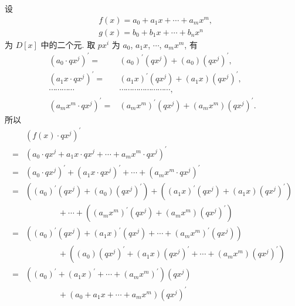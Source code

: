 \begin{pf}
    设
    \begin{align*}
         & f(x) = a_0 + a_1 x + \cdots + a_m x^m, \\
         & g(x) = b_0 + b_1 x + \cdots + b_n x^n
    \end{align*}
    为 $D[x]$ 中的二个元. 取 $px^i$ 为 $a_0$, $a_1 x$, $\cdots$, $a_m x^m$, 有
    \begin{align*}
        (a_0 \cdot qx^j)^{\prime}     = {} & (a_0)^{\prime} (qx^j) + (a_0) (qx^j)^{\prime},           \\
        (a_1 x \cdot qx^j)^{\prime}   = {} & (a_1 x)^{\prime} (qx^j) + (a_1 x) (qx^j)^{\prime},       \\
        \cdots \cdots \cdots \cdots        & \cdots \cdots \cdots \cdots \cdots \cdots \cdots \cdots, \\
        (a_m x^m \cdot qx^j)^{\prime} = {} & (a_m x^m)^{\prime} (qx^j) + (a_m x^m) (qx^j)^{\prime}.
    \end{align*}
    所以
    \begin{align*}
             & (f(x) \cdot qx^j)^{\prime}                                                                             \\
        = {} & (a_0 \cdot qx^j + a_1 x \cdot qx^j + \cdots + a_m x^m \cdot qx^j)^{\prime}                             \\
        = {} & (a_0 \cdot qx^j)^{\prime} + (a_1 x \cdot qx^j)^{\prime} + \cdots
        + (a_m x^m \cdot qx^j)^{\prime}                                                                               \\
        = {} & ((a_0)^{\prime} (qx^j) + (a_0) (qx^j)^{\prime}) + ((a_1 x)^{\prime} (qx^j)
        + (a_1 x) (qx^j)^{\prime})                                                                                    \\
             & \qquad \qquad + \cdots + ((a_m x^m)^{\prime} (qx^j) + (a_m x^m) (qx^j)^{\prime})                       \\
        = {} & ((a_0)^{\prime} (qx^j) + (a_1 x)^{\prime} (qx^j) + \cdots + (a_m x^m)^{\prime} (qx^j))                 \\
             & \qquad \qquad + ((a_0) (qx^j)^{\prime} + (a_1 x) (qx^j)^{\prime} + \cdots + (a_m x^m) (qx^j)^{\prime}) \\
        = {} & ((a_0)^{\prime} + (a_1 x)^{\prime} + \cdots + (a_m x^m)^{\prime}) (qx^j)                               \\
             & \qquad \qquad + (a_0 + a_1 x + \cdots + a_m x^m) (qx^j)^{\prime}                                       \\

\end{align*}
\end{pf}
